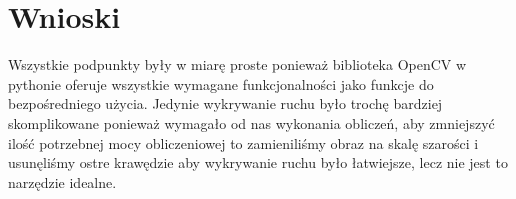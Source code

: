 \documentclass[a4paper,12pt]{extarticle}  %
\begin{document}
\section{Wnioski}
Wszystkie podpunkty były w miarę proste ponieważ biblioteka OpenCV w pythonie oferuje wszystkie wymagane funkcjonalności jako funkcje do bezpośredniego użycia.
Jedynie wykrywanie ruchu było trochę bardziej skomplikowane ponieważ wymagało od nas wykonania obliczeń,
aby zmniejszyć ilość potrzebnej mocy obliczeniowej to zamieniliśmy obraz na skalę szarości i usunęliśmy ostre krawędzie aby wykrywanie ruchu było łatwiejsze, lecz nie jest to narzędzie idealne.
\end{document}
